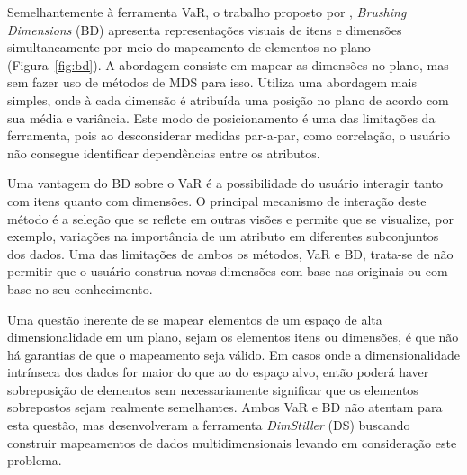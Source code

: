 Semelhantemente à ferramenta VaR, o trabalho proposto por
\cite{Turkay2011}, \emph{Brushing Dimensions} (BD) apresenta
representações visuais de itens e dimensões simultaneamente
por meio do mapeamento de elementos no plano
(Figura~\ref{fig:bd}). A abordagem consiste em mapear as
dimensões no plano, mas sem fazer uso de métodos de MDS  para
isso.  Utiliza uma abordagem mais simples, onde à cada
dimensão é atribuída uma posição no plano de acordo com sua
média e variância. Este modo de posicionamento é uma das
limitações da ferramenta, pois ao desconsiderar medidas
par-a-par, como correlação, o usuário não consegue
identificar dependências entre os atributos.

Uma vantagem do BD sobre o VaR é a possibilidade do usuário
interagir tanto com itens quanto com dimensões. O principal
mecanismo de interação deste método é a seleção que se
reflete em outras visões e permite que se visualize, por
exemplo, variações na importância de um atributo em
diferentes subconjuntos dos dados. Uma das limitações de
ambos os métodos, VaR e BD, trata-se de não permitir que o
usuário construa novas dimensões com base nas originais ou
com base no seu conhecimento.

Uma questão inerente de se mapear elementos de um espaço de
alta dimensionalidade em um plano, sejam os elementos itens
ou dimensões, é que não há garantias de que o mapeamento
seja válido. Em casos onde a dimensionalidade intrínseca dos
dados for maior do que ao do espaço alvo, então poderá haver
sobreposição de elementos sem necessariamente significar que
os elementos sobrepostos sejam realmente semelhantes. Ambos
VaR e BD não atentam para esta questão, mas
\cite{Ingram2010} desenvolveram a ferramenta
\emph{DimStiller} (DS) buscando construir mapeamentos de
dados multidimensionais levando em consideração este
problema. 

